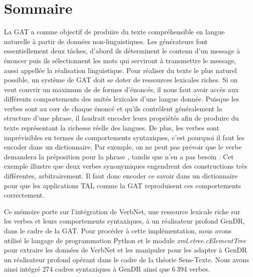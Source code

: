 \chapter*{Sommaire} 	%
La \ac{GAT} a comme objectif de produire du texte compréhensible en langue naturelle à partir de données non-linguistiques. Les générateurs font essentiellement deux tâches, d'abord ils déterminent le contenu d'un message à énoncer puis ils sélectionnent les mots qui serviront à transmettre le message, aussi appellée la réalisation linguistique. Pour réaliser du texte le plus naturel possible, un système de \ac{GAT} doit se doter de ressources lexicales riches. Si on veut couvrir un maximum de de formes d'énoncés, il nous faut avoir accès aux différents comportements des unités lexicales d'une langue donnée. Puisque les verbes sont au c\oe{}r de chaque énoncé et qu'ils contrôlent généralement la structure d'une phrase, il faudrait encoder leurs propriétés afin de produire du texte représentant la richesse réelle des langues. De plus, les verbes sont imprévisibles en termes de comportements syntaxiques, c'est pourquoi il faut les encoder dans un dictionnaire. Par exemple, on ne peut pas prévoir que le verbe  demandera la préposition  pour la phrase , tandis que  n'en a pas besoin . Cet exemple illustre que deux verbes synonymiques engendrent des constructions très différentes, arbitrairement. Il faut donc encoder ce savoir dans un dictionnaire pour que les applications \ac{TAL} comme la \ac{GAT} reproduisent ces comportements correctement.

Ce mémoire porte sur l'intégration de VerbNet, une ressource lexicale riche sur les verbes et leurs comportements syntaxiques, à un réalisateur profond GenDR, dans le cadre de la \ac{GAT}. Pour procéder à cette implémentation, nous avons utilisé le langage de programmation Python et le module \emph{xml.etree.cElementTree} pour extraire les données de VerbNet et les manipuler pour les adapter à GenDR un réalisateur profond opérant dans le cadre de la théorie Sens-Texte. Nous avons ainsi intégré 274 cadres syntaxiques à GenDR ainsi que 6\,394 verbes.

